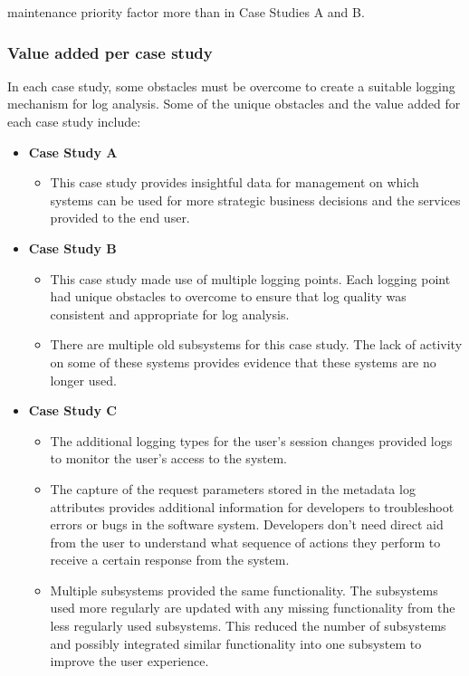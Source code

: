 maintenance priority factor more than in Case Studies A and B.

\subsubsection{Value added per case study}
In each case study, some obstacles must be overcome to create a suitable logging mechanism for log analysis. Some of the unique obstacles and the value added for each case study include:

\begin{itemize}
	\item \textbf{Case Study A}
		\begin{itemize}
			\item This case study provides insightful data for management on which systems can be used for more strategic business decisions and the services provided to the end user.
		\end{itemize}
	\item \textbf{Case Study B}
	\begin{itemize}
		\item This case study made use of multiple logging points. Each logging point had unique obstacles to overcome to ensure that log quality was consistent and appropriate for log analysis.
		\item There are multiple old subsystems for this case study. The lack of activity on some of these systems provides evidence that these systems are no longer used.
	\end{itemize}
	\item \textbf{Case Study C}
	\begin{itemize}
		\item The additional logging types for the user's session changes provided logs to monitor the user's access to the system.
		\item The capture of the request parameters stored in the metadata log attributes provides additional information for developers to troubleshoot errors or bugs in the software system. Developers don't need direct aid from the user to understand what sequence of actions they perform to receive a certain response from the system.
		\item Multiple subsystems provided the same functionality. The subsystems used more regularly are updated with any missing functionality from the less regularly used subsystems. This reduced the number of subsystems and possibly integrated similar functionality into one subsystem to improve the user experience. 
	\end{itemize}
\end{itemize}

